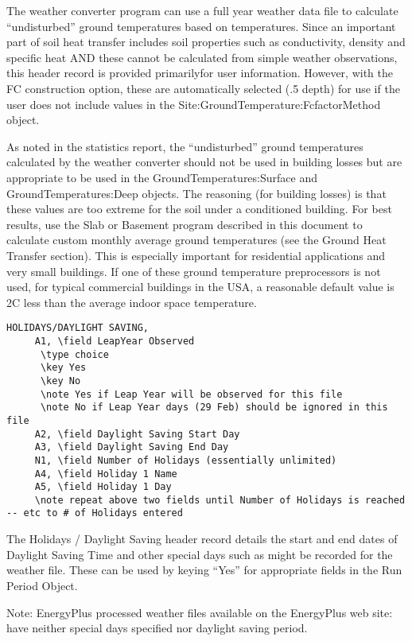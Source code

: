 The weather converter program can use a full year weather data file to calculate ``undisturbed'' ground temperatures based on temperatures. Since an important part of soil heat transfer includes soil properties such as conductivity, density and specific heat AND these cannot be calculated from simple weather observations, this header record is provided primarilyfor user information. However, with the FC construction option, these are automatically selected (.5 depth) for use if the user does not include values in the Site:GroundTemperature:FcfactorMethod object.

As noted in the statistics report, the ``undisturbed'' ground temperatures calculated by the weather converter should not be used in building losses but are appropriate to be used in the GroundTemperatures:Surface and GroundTemperatures:Deep objects. The reasoning (for building losses) is that these values are too extreme for the soil under a conditioned building. For best results, use the Slab or Basement program described in this document to calculate custom monthly average ground temperatures (see the Ground Heat Transfer section). This is especially important for residential applications and very small buildings. If one of these ground temperature preprocessors is not used, for typical commercial buildings in the USA, a reasonable default value is 2C less than the average indoor space temperature.

\begin{lstlisting}
HOLIDAYS/DAYLIGHT SAVING,
     A1, \field LeapYear Observed
      \type choice
      \key Yes
      \key No
      \note Yes if Leap Year will be observed for this file
      \note No if Leap Year days (29 Feb) should be ignored in this file
     A2, \field Daylight Saving Start Day
     A3, \field Daylight Saving End Day
     N1, \field Number of Holidays (essentially unlimited)
     A4, \field Holiday 1 Name
     A5, \field Holiday 1 Day
     \note repeat above two fields until Number of Holidays is reached
-- etc to # of Holidays entered
\end{lstlisting}

The Holidays / Daylight Saving header record details the start and end dates of Daylight Saving Time and other special days such as might be recorded for the weather file. These can be used by keying ``Yes'' for appropriate fields in the Run Period Object.

Note: EnergyPlus processed weather files available on the EnergyPlus web site: have neither special days specified nor daylight saving period.

